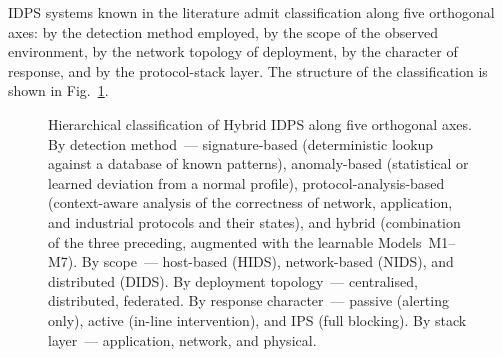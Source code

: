 IDPS systems known in the literature admit classification along five
orthogonal axes: by the detection method employed, by the scope of
the observed environment, by the network topology of deployment, by
the character of response, and by the protocol-stack layer. The
structure of the classification is shown in
Fig.~\ref{fig:orga_classes_idps}.

\begin{figure}[htbp]
\centering
{}
\caption{Hierarchical classification of Hybrid IDPS along five
orthogonal axes. By detection method~--- signature-based
(deterministic lookup against a database of known patterns),
anomaly-based (statistical or learned deviation from a normal
profile), protocol-analysis-based (context-aware analysis of the
correctness of network, application, and industrial protocols and
their states), and hybrid (combination of the three preceding,
augmented with the learnable Models~M1--M7). By scope~---
host-based (HIDS), network-based (NIDS), and distributed (DIDS).
By deployment topology~--- centralised, distributed, federated.
By response character~--- passive (alerting only), active
(in-line intervention), and IPS (full blocking). By stack
layer~--- application, network, and physical.}
\label{fig:orga_classes_idps}
\end{figure}

